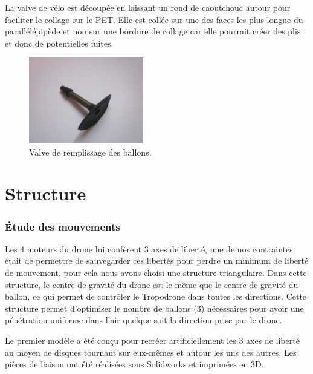 \documentclass[a4paper,11pt]{article}
\begin{document}
La valve de vélo est découpée en laissant un rond de caoutchouc autour pour faciliter le collage sur le PET. Elle est collée sur une des faces les plus longue du parallélépipède et non sur une bordure de collage car elle pourrait créer des plis et donc de potentielles fuites.

\begin{figure}[H]
  \centering
  \includegraphics[width=5cm]{../Images/valve.JPG}
  \caption{Valve de remplissage des ballons.}
\end{figure}

\section{Structure}

\subsubsection{Étude des mouvements}

Les 4 moteurs du drone lui confèrent 3 axes de liberté, une de nos contraintes était de permettre de sauvegarder ces libertés pour perdre un minimum de liberté de mouvement, pour cela nous avons choisi une structure triangulaire. Dans cette structure, le centre de gravité du drone est le même que le centre de gravité du ballon, ce qui permet de contrôler le Tropodrone dans toutes les directions. Cette structure permet d'optimiser le nombre de ballons (3) nécessaires pour avoir une pénétration uniforme dans l'air quelque soit la direction prise par le drone.

Le premier modèle a été conçu pour recréer artificiellement les 3 axes de liberté au moyen de disques tournant sur eux-mêmes et autour les uns des autres. Les pièces de liaison ont été réalisées sous Solidworks et imprimées en 3D.
\end{document}
